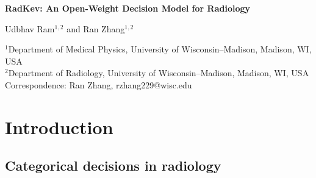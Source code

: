 \documentclass[11pt]{article}
\begin{document}
\begin{center}
{\Large\bfseries RadKev: An Open-Weight Decision Model for Radiology\par}
\vspace{12pt}
Udbhav Ram$^{1,2}$ and Ran Zhang$^{1,2}$\par
\vspace{6pt}
{\small $^{1}$Department of Medical Physics, University of Wisconsin--Madison, Madison, WI, USA\\
$^{2}$Department of Radiology, University of Wisconsin--Madison, Madison, WI, USA\\[4pt]
Correspondence: Ran Zhang, rzhang229@wisc.edu\par}
\end{center}

\vspace{6pt}
\begin{abstract}\setlength{\parskip}{6pt}

\end{abstract}

\section{Introduction}\label{sec:intro}

\subsection{Categorical decisions in radiology}\label{sec:intro_decisions}
\end{document}
